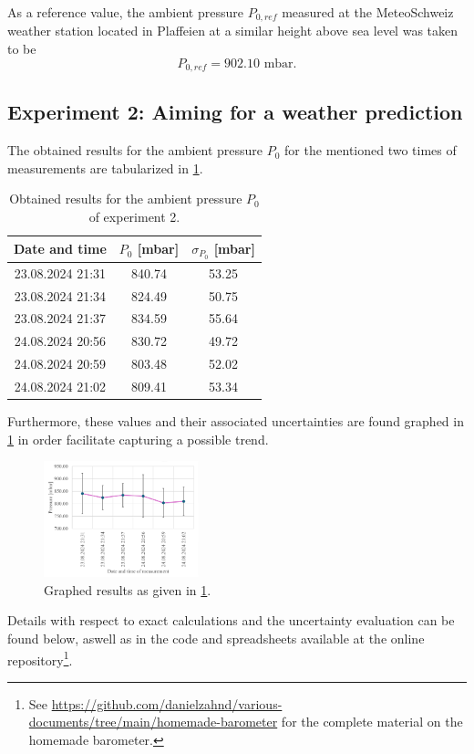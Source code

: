\documentclass[a4paper,10pt, twocolumn]{article}
\begin{document}
As a reference value, the ambient pressure $P_{0,ref}$ measured at the MeteoSchweiz weather station located in Plaffeien at a similar height above sea level was taken to be \begin{equation}
	P_{0,ref} = 902.10 \text{ mbar}.
\end{equation}

\subsection{Experiment 2: Aiming for a weather prediction}
The obtained results for the ambient pressure $P_0$ for the mentioned two times of measurements are tabularized in \cref{tab:experiment_2_results}.
\begin{table}[h]
	\small
	\centering
	\begin{tabular}{|c|c|c|}
		\hline
		 \textbf{Date and time} & \textbf{$P_0$ [mbar]} & \textbf{$\sigma_{P_0}$ [mbar]} \\
		\hline\hline
		23.08.2024 21:31 &	840.74 &	53.25 \\
		\hline
		23.08.2024 21:34 &	824.49 &	50.75 \\
		\hline
		23.08.2024 21:37 &	834.59 &	55.64 \\
		\hline
		24.08.2024 20:56 &	830.72 &	49.72 \\
		\hline
		24.08.2024 20:59 &	803.48 &	52.02 \\
		\hline
		24.08.2024 21:02 &	809.41 &	53.34 \\
		\hline
	\end{tabular}
	\label{tab:experiment_2_results}
	\caption{Obtained results for the ambient pressure $P_0$ of experiment 2.}
\end{table} Furthermore, these values and their associated uncertainties are found graphed in \cref{fig:experiment_2_results} in order facilitate capturing a possible trend.
\begin{figure}[h]
	\centering
	\includegraphics[width=0.4\textwidth]{figures/experiment_2_results_br.pdf}
	\caption{Graphed results as given in \cref{tab:experiment_2_results}.}
	\label{fig:experiment_2_results}
\end{figure} Details with respect to exact calculations and the uncertainty evaluation can be found below, aswell as in the code and spreadsheets available at the online repository\footnote{See \url{https://github.com/danielzahnd/various-documents/tree/main/homemade-barometer} for the complete material on the homemade barometer.}.
\end{document}
